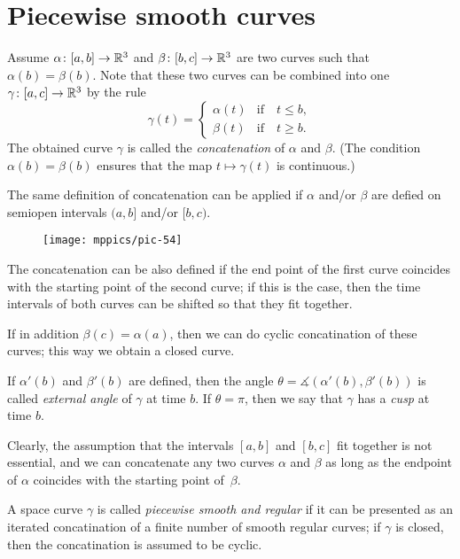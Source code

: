 \section{Piecewise smooth curves}



Assume $\alpha\colon[a,b]\to \mathbb{R}^3$ and $\beta\:[b,c]\z\to \RR^3$ are two curves such that $\alpha(b)=\beta(b)$.
Note that these two curves can be combined into one $\gamma\:[a,c]\z\to \RR^3$ by the rule 
\[\gamma(t)=
\begin{cases}
\alpha(t)&\text{if}\quad t\le b,
\\
\beta(t)&\text{if}\quad t\ge b.
\end{cases}
\]
The obtained curve $\gamma$ is called the 
\emph{concatenation} of $\alpha$ and $\beta$. %
(The condition $\alpha(b)=\beta(b)$ ensures that the map $t\mapsto\gamma(t)$ is continuous.)

The same definition of concatenation can be applied if $\alpha$ and/or $\beta$ are defied on semiopen intervals 
$(a,b]$ and/or $[b,c)$.

\begin{wrapfigure}{o}{25 mm}
\vskip-2mm
\centering
\texttt{[image: mppics/pic-54]}
\end{wrapfigure}

The concatenation can be also defined if the end point of the first curve coincides with the starting point of the second curve;
if this is the case, then the time intervals of both curves can be shifted so that they fit together. 

If in addition $\beta(c)=\alpha(a)$, then we can do cyclic concatination of these curves;
this way we obtain a closed curve.

If $\alpha'(b)$ and $\beta'(b)$ are defined, then the angle $\theta=\measuredangle(\alpha'(b),\beta'(b))$ is called \emph{external angle} of $\gamma$ at time $b$.
If $\theta=\pi$, then we say that $\gamma$ has a \emph{cusp} at  time $b$.

Clearly, the assumption that the intervals $[a,b]$ and $[b,c]$ fit together is not essential, and we can concatenate any two curves $\alpha$ and $\beta$ as long as the endpoint of $\alpha$ coincides with the starting point of~$\beta$. 

A space curve $\gamma$ is called \emph{piecewise smooth and regular} if it can be presented as an iterated concatination of a finite number of smooth regular curves; if $\gamma$ is closed, then the  concatination is assumed to be cyclic.

